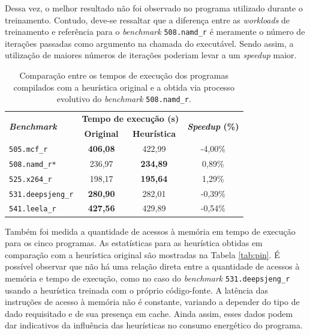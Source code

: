 \documentclass[
	12pt,				%
	openright,			%
	twoside,			%
	a4paper,			%
	tcc,			%
	]{ABNT-DC-UEL}
\begin{document}
Dessa vez, o melhor resultado não foi observado no programa utilizado durante o treinamento. Contudo, deve-se ressaltar que a diferença entre as \textit{workloads} de treinamento e referência para o \textit{benchmark} \texttt{508.namd\_r} é meramente o número de iterações passadas como argumento na chamada do executável. Sendo assim, a utilização de maiores números de iterações poderiam levar a um \textit{speedup} maior.

\begin{table}[htb]
    \centering
    \begin{tabular}{lccc}
        \hline
        \multirow{2}{*}{\textbf{\textit{Benchmark}}} & \multicolumn{2}{c}{\textbf{Tempo de execução (s)}}  & \multirow{2}{*}{\textbf{\textit{Speedup} (\%)}} \\\cline{2-3}
                         & \textbf{Original}  & \textbf{Heurística} &  \\
        \hline
        \texttt{505.mcf\_r}         & \textbf{406,08}   & 422,99          & -4,00\% \\
        \texttt{508.namd\_r*}        & 236,97   & \textbf{234,89}          & 0,89\%	 \\
        \texttt{525.x264\_r}        & 198,17            & \textbf{195,64} & 1,29\%  \\
        \texttt{531.deepsjeng\_r}  & \textbf{280,90}            & 282,01 & -0,39\%  \\
        \texttt{541.leela\_r}	    & \textbf{427,56}   & 429,89          & -0,54\% \\\hline
    \end{tabular}
    \caption{Comparação entre os tempos de execução dos programas compilados com a heurística original e a obtida via processo evolutivo do \textit{benchmark} \texttt{508.namd\_r}.}
    \label{tab:speedup_namd}
\end{table}

Também foi medida a quantidade de acessos à memória em tempo de execução para os cinco programas. As estatísticas para as heurística obtidas em comparação com a heurística original são mostradas na Tabela \ref{tab:pin}. É possível observar que não há uma relação direta entre a quantidade de acessos à memória e tempo de execução, como no caso do \textit{benchmark} \texttt{531.deepsjeng\_r} usando a heurística treinada com o próprio código-fonte. A latência das instruções de acesso à memória não é constante, variando a depender do tipo de dado requisitado e de sua presença em cache. Ainda assim, esses dados podem dar indicativos da influência das heurísticas no consumo energético do programa.
\end{document}
